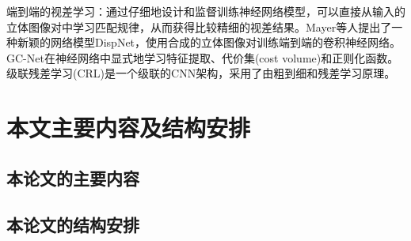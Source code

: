 端到端的视差学习：通过仔细地设计和监督训练神经网络模型，可以直接从输入的立体图像对中学习匹配规律，从而获得比较精细的视差结果。Mayer\cite{mayer2016large}等人提出了一种新颖的网络模型DispNet，使用合成的立体图像对训练端到端的卷积神经网络。GC-Net\cite{kendall2017end}在神经网络中显式地学习特征提取、代价集(cost volume)和正则化函数。级联残差学习(CRL)\cite{pang2017cascade}是一个级联的CNN架构，采用了由粗到细和残差学习原理。

\section{本文主要内容及结构安排}
\subsection{本论文的主要内容}

\subsection{本论文的结构安排}












